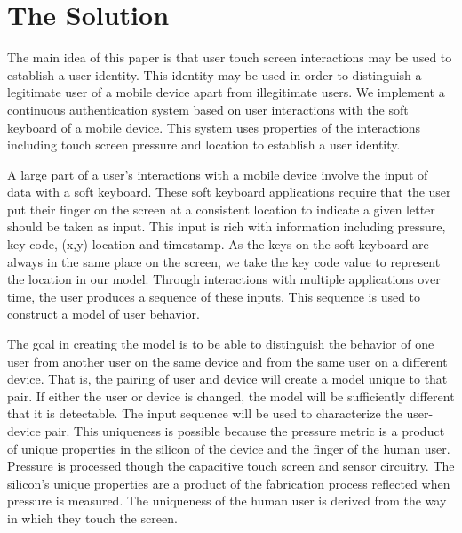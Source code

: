 \section{The Solution}
\label{the_solution}

The main idea of this paper is that user
touch screen interactions may be used 
to establish a user identity.
%
This identity may be used in order to
distinguish a legitimate user of a mobile device apart from
illegitimate users.
%
We implement a continuous authentication system
based on user interactions with the soft keyboard of
a mobile device.
This system uses properties of the interactions including
touch screen pressure and location
to establish a user identity.

A large part of a user's interactions with a mobile
device involve the input of data with a soft keyboard.
These soft keyboard applications require that
the user put their finger on the screen at a consistent
location to indicate a given letter should be taken as input.
This input is rich with information including
pressure,
key code,
(x,y) location and
timestamp.
As the keys on the soft keyboard are always in the same place on the screen,
we take the key code value to represent the location in our model.
Through interactions with multiple applications over time,
the user produces a sequence of these inputs.
This sequence is used to construct a model of user behavior.

The goal in creating the model
is to be able to distinguish the behavior
of one user from 
another user on the same device and
from the same user on a different device.
That is, the pairing of user and device will
create a model unique to that pair.
If either the user or device is changed,
the model will be sufficiently different
that it is detectable.
The input sequence will be used to characterize the user-device pair.
%
This uniqueness is possible because
the pressure metric is a product of 
unique properties in
the silicon of the device and
the finger of the human user.
%
Pressure is processed though the capacitive touch screen and sensor circuitry.
The silicon's unique properties
are a product of the fabrication process %
reflected when pressure is measured.
The uniqueness of the human user is derived from
the way in which they touch the screen.

